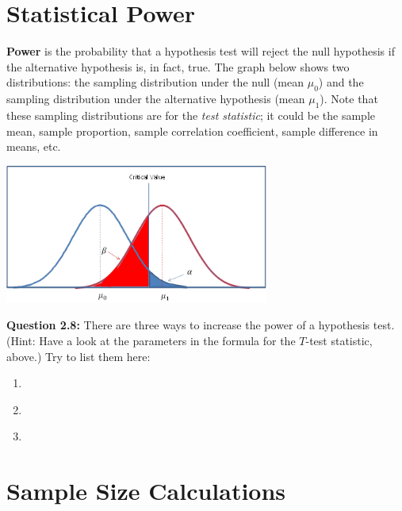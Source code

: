 
\section{Statistical Power}

\textbf{Power} is the probability that a hypothesis test will reject the null hypothesis if the alternative hypothesis is, in fact, true. The graph below shows two distributions: the sampling distribution under the null (mean $\mu_0$) and the sampling distribution under the alternative hypothesis (mean $\mu_1$). Note that these sampling distributions are for the \emph{test statistic}; it could be the sample mean, sample proportion, sample correlation coefficient, sample difference in means, etc.

\begin{center}
\includegraphics[width=0.65\textwidth]{img/statistical-power-chart.png}
\end{center}

\begin{mdframed}
\textbf{Question 2.8:} There are three ways to increase the power of a hypothesis test. (Hint: Have a look at the parameters in the formula for the $T$-test statistic, above.) Try to list them here:
\begin{enumerate}
\item ~
\item ~
\item ~
\end{enumerate}
\vspace{5mm}
\end{mdframed}


\section{Sample Size Calculations}


